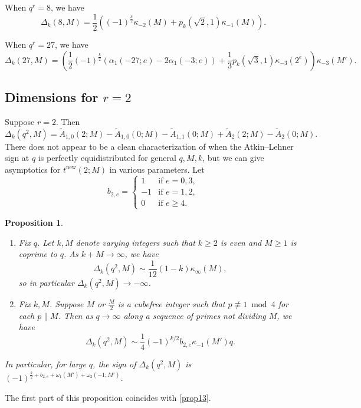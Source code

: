 \documentclass[11pt]{amsart}
\newcommand{\new}{\mathrm{new}}
\renewcommand{\mod}{\bmod}
\numberwithin{lem}{section}
\newtheorem{prop}[lem]{Proposition}
\theoremstyle{remark}
\theoremstyle{definition}
\numberwithin{equation}{section}
\begin{document}
When $q^r = 8$, we have
\[  \Delta_k(8,M)  = \frac 12 \left( (-1)^{\frac k2} \kappa_{-2}(M) + p_k(\sqrt 2, 1) \kappa_{-1}(M) \right). \]

When $q^r = 27$, we have
\[ \Delta_k(27,M)  = \left( \frac 12 (-1)^{\frac k2} (\alpha_1(-27;e) - 2\alpha_1(-3;e)) + \frac 13 p_k(\sqrt 3,1) \kappa_{-3}(2^e) \right) \kappa_{-3}(M'). \]

\subsection{Dimensions for $r = 2$}
Suppose $r=2$.  Then
\[  \Delta_k(q^2,M)  = \tilde A_{1,0}(2;M) - \tilde A_{1,0}(0;M) - \tilde A_{1,1}(0;M) + \tilde A_2(2;M) - \tilde A_2(0;M).  \]
 There does not appear to be a clean characterization of when the Atkin--Lehner sign at $q$ is perfectly equidistributed for general $q, M, k$, but we can give asymptotics for $t^\new(2;M)$ in various parameters.
Let
\[ b_{2,e} = \begin{cases}
1 & \text{if }e = 0, 3, \\
-1 & \text{if }e = 1, 2, \\
0 & \text{if }e \ge 4.
\end{cases} \]


\begin{prop} \label{prop:q2}
\begin{enumerate}
\item Fix $q$. Let $k, M$ denote varying integers such that $k \ge 2$ is even and $M \ge 1$ is coprime to $q$.  As $k+M \to \infty$, we have
\[ \Delta_k(q^2,M) \sim \frac{1}{12} (1-k)\kappa_\infty(M), \]
so in particular $\Delta_k(q^2,M) \to -\infty$.

\item Fix $k, M$.  Suppose $M$ or $\frac M2$ is a cubefree integer such that
$p \not \equiv 1 \mod 4$ for each $p \parallel M$.  Then as $q \to \infty$ along a sequence of primes not dividing $M$, we have
\[ \Delta_k(q^2,M) \sim \frac 14 (-1)^{k/2} b_{2,e} \kappa_{-1}(M') q. \]
\end{enumerate}
In particular, for large $q$, the sign of $\Delta_k(q^2,M)$ is $(-1)^{\frac k2 + b_{2,e} + \omega_1(M') + \omega_2(-1;M')}$.  
\end{prop}

The first part of this proposition coincides with \cref{prop13}.
\end{document}
